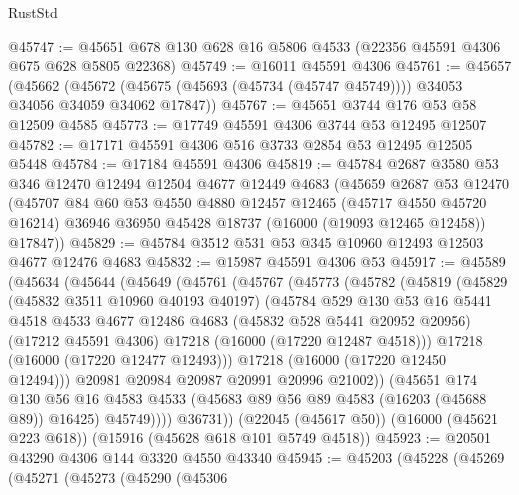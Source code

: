 \begin{lexlean}{RustStd}
\begin{coremodule}
@45747 := @45651 @678 @130 @628 @16 @5806 @4533 (@22356 @45591 @4306 @675 @628 @5805 @22368)
@45749 := @16011 @45591 @4306
@45761 := @45657
    (@45662 (@45672 (@45675 (@45693 (@45734 (@45747 @45749)))) @34053 @34056 @34059 @34062 @17847))
@45767 := @45651 @3744 @176 @53 @58 @12509 @4585
@45773 := @17749 @45591 @4306 @3744 @53 @12495 @12507
@45782 := @17171 @45591 @4306 @516 @3733 @2854 @53 @12495 @12505 @5448
@45784 := @17184 @45591 @4306
@45819 := @45784
    @2687
    @3580
    @53
    @346
    @12470
    @12494
    @12504
    @4677
    @12449
    @4683
    (@45659
      @2687
      @53
      @12470
      (@45707
        @84
        @60
        @53
        @4550
        @4880
        @12457
        @12465
        (@45717 @4550 @45720 @16214)
        @36946
        @36950
        @45428
        @18737
        (@16000 (@19093 @12465 @12458))
        @17847))
@45829 := @45784 @3512 @531 @53 @345 @10960 @12493 @12503 @4677 @12476 @4683
@45832 := @15987 @45591 @4306 @53
@45917 := @45589
    (@45634
      (@45644
        (@45649
          (@45761
            (@45767
              (@45773
                (@45782
                  (@45819
                    (@45829
                      (@45832 @3511 @10960 @40193 @40197)
                      (@45784
                        @529
                        @130
                        @53
                        @16
                        @5441
                        @4518
                        @4533
                        @4677
                        @12486
                        @4683
                        (@45832 @528 @5441 @20952 @20956)
                        (@17212 @45591 @4306)
                        @17218
                        (@16000 (@17220 @12487 @4518)))
                      @17218
                      (@16000 (@17220 @12477 @12493)))
                    @17218
                    (@16000 (@17220 @12450 @12494)))
                  @20981
                  @20984
                  @20987
                  @20991
                  @20996
                  @21002))
              (@45651
                @174
                @130
                @56
                @16
                @4583
                @4533
                (@45683 @89 @56 @89 @4583 (@16203 (@45688 @89)) @16425)
                @45749))))
        @36731))
    (@22045 (@45617 @50))
    (@16000 (@45621 @223 @618))
    (@15916 (@45628 @618 @101 @5749 @4518))
@45923 := @20501 @43290 @4306 @144 @3320 @4550 @43340
@45945 := @45203
    (@45228
      (@45269
        (@45271
          (@45273
            (@45290
              (@45306

\end{coremodule}
\end{lexlean}
